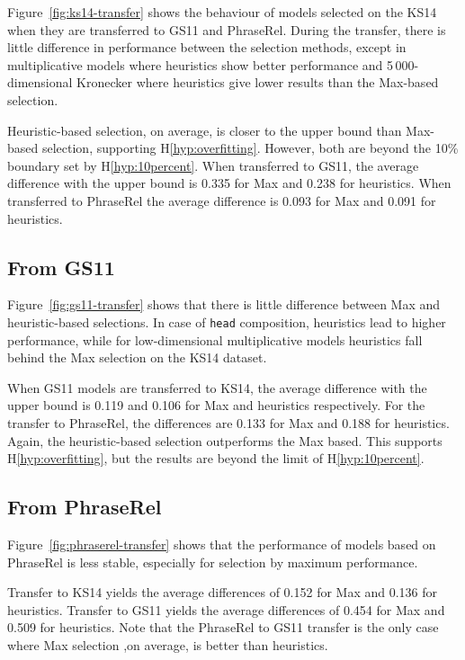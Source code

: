 Figure~\ref{fig:ks14-transfer} shows the behaviour of models selected on the KS14 when they are transferred to GS11 and PhraseRel. During the transfer, there is little difference in performance between the selection methods, except in multiplicative models where heuristics show better performance and 5\,000-dimensional Kronecker where heuristics give lower results than the Max-based selection.

Heuristic-based selection, on average, is closer to the upper bound than Max-based selection, supporting H\ref{hyp:overfitting}. However, both are beyond the 10\% boundary set by H\ref{hyp:10percent}. When transferred to GS11, the average difference with the upper bound is 0.335 for Max and 0.238 for heuristics. When transferred to PhraseRel the average difference is 0.093 for Max and 0.091 for heuristics.

\subsection{From GS11}
\label{sec:from-gs11}



Figure~\ref{fig:gs11-transfer} shows that there is little difference between Max and heuristic-based selections. In case of \texttt{head} composition, heuristics lead to higher performance, while for low-dimensional multiplicative models heuristics fall behind the Max selection on the KS14 dataset.

When GS11 models are transferred to KS14, the average difference with the upper bound is 0.119 and 0.106 for Max and heuristics respectively. For the transfer to PhraseRel, the differences are 0.133 for Max and 0.188 for heuristics. Again, the heuristic-based selection outperforms the Max based. This supports H\ref{hyp:overfitting}, but the results are beyond the limit of H\ref{hyp:10percent}.

\subsection{From PhraseRel}
\label{sec:from-phraserel}



Figure~\ref{fig:phraserel-transfer} shows that the performance of models based on PhraseRel is less stable, especially for selection by maximum performance.

Transfer to KS14 yields the average differences of 0.152 for Max and 0.136 for heuristics. Transfer to GS11 yields the average differences of 0.454 for Max and 0.509 for heuristics. Note that the PhraseRel to GS11 transfer is the only case where Max selection ,on average, is better than heuristics.

